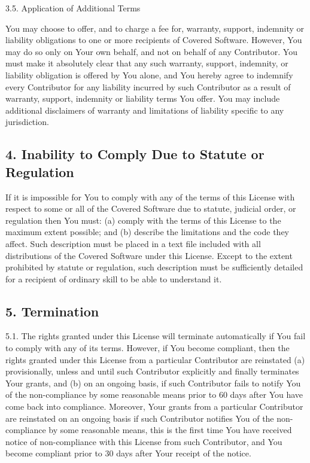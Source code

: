 \documentclass[letterpaper,10pt,english]{sphinxmanual}
\begin{document}
3.5. Application of Additional Terms

You may choose to offer, and to charge a fee for, warranty, support,
indemnity or liability obligations to one or more recipients of Covered
Software. However, You may do so only on Your own behalf, and not on
behalf of any Contributor. You must make it absolutely clear that any
such warranty, support, indemnity, or liability obligation is offered by
You alone, and You hereby agree to indemnify every Contributor for any
liability incurred by such Contributor as a result of warranty, support,
indemnity or liability terms You offer. You may include additional
disclaimers of warranty and limitations of liability specific to any
jurisdiction.


\subsection{4. Inability to Comply Due to Statute or Regulation}
\label{\detokenize{warranty:inability-to-comply-due-to-statute-or-regulation}}
If it is impossible for You to comply with any of the terms of this
License with respect to some or all of the Covered Software due to
statute, judicial order, or regulation then You must: (a) comply with
the terms of this License to the maximum extent possible; and (b)
describe the limitations and the code they affect. Such description must
be placed in a text file included with all distributions of the Covered
Software under this License. Except to the extent prohibited by statute
or regulation, such description must be sufficiently detailed for a
recipient of ordinary skill to be able to understand it.


\subsection{5. Termination}
\label{\detokenize{warranty:termination}}
5.1. The rights granted under this License will terminate automatically
if You fail to comply with any of its terms. However, if You become
compliant, then the rights granted under this License from a particular
Contributor are reinstated (a) provisionally, unless and until such
Contributor explicitly and finally terminates Your grants, and (b) on an
ongoing basis, if such Contributor fails to notify You of the
non-compliance by some reasonable means prior to 60 days after You have
come back into compliance. Moreover, Your grants from a particular
Contributor are reinstated on an ongoing basis if such Contributor
notifies You of the non-compliance by some reasonable means, this is the
first time You have received notice of non-compliance with this License
from such Contributor, and You become compliant prior to 30 days after
Your receipt of the notice.
\end{document}
